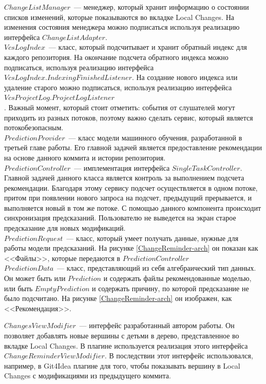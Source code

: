 $ChangeListManager$~--- менеджер, который хранит информацию о состоянии списков изменений, которые показываются во вкладке Local Changes. На изменения состояния менеджера можно подписаться используя реализацию интерфейса $ChangeListAdapter$.\\


$VcsLogIndex$~--- класс, который подсчитывает и хранит обратный индекс для каждого репозитория. На окончание подсчета обратного индекса можно подписаться, используя реализацию интерфейса $VcsLogIndex.IndexingFinishedListener$. На создание нового индекса или удаление старого можно подписаться, используя реализацию интерфейса $VcsProjectLog.ProjectLogListener$\\. Важный момент, который стоит отметить: события от слушателей могут приходить из разных потоков, поэтому важно сделать сервис, который является потокобезопасным.\\


$PredictionProvider$~--- класс модели машинного обучения, разработанной в третьей главе работы. Его главной задачей является предоставление рекомендации на основе данного коммита и истории репозитория.\\


$PredictionController$~--- имплементация интерфейса $SingleTaskController$. Главной задачей данного класса является контроль за выполнением подсчета рекомендации. Благодаря этому сервису подсчет осуществляется в одном потоке, притом при появлении нового запроса на подсчет, предыдущий прерывается, и выполняется новый в том же потоке. С помощью данного компонента происходит синхронизация предсказаний. Пользователю не выведется на экран старое предсказание для новых модификаций.\\


$PredictionRequest$~--- класс, который умеет получать данные, нужные для работы модели предсказаний. На рисунке \ref{ChangeReminder-arch} он показан как <<Файлы>>, которые передаются в $PredictionController$\\


$PredictionData$~--- класс, представляющий из себя алгебраический тип данных. Он может быть или $Prediction$ и содержать файлы рекомендованные моделью, или быть $EmptyPrediction$ и содержать причину, по которой предсказание не было подсчитано. На рисунке \ref{ChangeReminder-arch} он изображен, как <<Рекомендация>>.


$ChangesViewModifier$~--- интерфейс разработанный автором работы. Он позволяет добавлять новые вершины с детьми в дерево, представленное во вкладке Local Changes. В плагине используется реализация этого интерфейса $ChangeReminderViewModifier$. В последствии этот интерфейс использовался, например, в Git4Idea плагине для того, чтобы показывать вершину в Local Changes с модификациями из предыдущего коммита. \\

